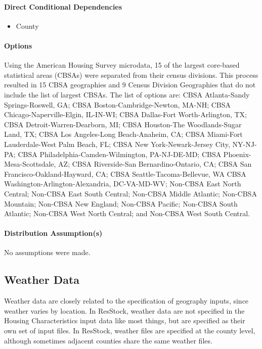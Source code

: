 \paragraph{Direct Conditional Dependencies}
\begin{itemize}
    \item County
\end{itemize}

\paragraph{Options}
Using the American Housing Survey microdata, 15 of the largest core-based statistical areas (CBSAs) were separated from their census divisions. This process resulted in 15 CBSA geographies and 9 Census Division Geographies that do not include the list of largest CBSAs. The list of options are: CBSA Atlanta-Sandy Springs-Roswell, GA; CBSA Boston-Cambridge-Newton, MA-NH; CBSA Chicago-Naperville-Elgin, IL-IN-WI; CBSA Dallas-Fort Worth-Arlington, TX; CBSA Detroit-Warren-Dearborn, MI; CBSA Houston-The Woodlands-Sugar Land, TX; CBSA Los Angeles-Long Beach-Anaheim, CA; CBSA Miami-Fort Lauderdale-West Palm Beach, FL; CBSA New York-Newark-Jersey City, NY-NJ-PA; CBSA Philadelphia-Camden-Wilmington, PA-NJ-DE-MD; CBSA Phoenix-Mesa-Scottsdale, AZ; CBSA Riverside-San Bernardino-Ontario, CA; CBSA San Francisco-Oakland-Hayward, CA; CBSA Seattle-Tacoma-Bellevue, WA
CBSA Washington-Arlington-Alexandria, DC-VA-MD-WV; Non-CBSA East North Central; Non-CBSA East South Central; Non-CBSA Middle Atlantic; Non-CBSA Mountain; Non-CBSA New England; Non-CBSA Pacific; Non-CBSA South Atlantic; Non-CBSA West North Central; and Non-CBSA West South Central.

\paragraph{Distribution Assumption(s)}
No assumptions were made.

\subsection{Weather Data}
Weather data are closely related to the specification of geography inputs, since weather varies by location. In ResStock, weather data are not specified in the Housing Characteristics input data like most things, but are specified as their own set of input files. In ResStock, weather files are specified at the county level, although sometimes adjacent counties share the same weather files.

